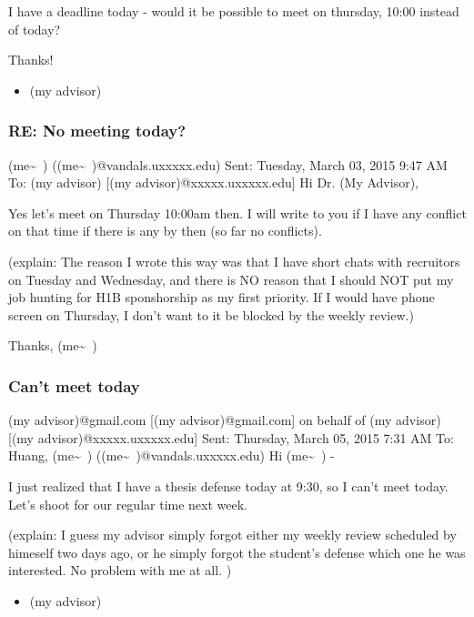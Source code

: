 \documentclass[9pt,b5paper]{article}
\begin{document}
I have a deadline today - would it be possible to meet on thursday, 10:00 instead of today?

Thanks!

\begin{itemize}
\item (my advisor)
\end{itemize}
\subsubsection{RE: No meeting today?}
\label{sec-2-3-2}
(me\textasciitilde{}~) ((me\textasciitilde{}~)@vandals.uxxxxx.edu)
Sent:        Tuesday, March 03, 2015 9:47 AM
To:        
(my advisor) [(my advisor)@xxxxx.uxxxxx.edu]
Hi Dr. (My Advisor), 

Yes let's meet on Thursday 10:00am then. I will write to you if I have any conflict on that time if there is any by then (so far no conflicts). 

(explain: The reason I wrote this way was that I have short chats with recruitors on Tuesday and Wednesday, and there is NO reason that I should NOT put my job hunting for H1B sponshorship as my first priority. If I would have phone screen on Thursday, I don't want to it be blocked by the weekly review.)

Thanks,
(me\textasciitilde{}~)
\subsubsection{Can't meet today}
\label{sec-2-3-3}
(my advisor)@gmail.com [(my advisor)@gmail.com] on behalf of (my advisor) [(my advisor)@xxxxx.uxxxxx.edu]
Sent:        Thursday, March 05, 2015 7:31 AM
To:        
Huang, (me\textasciitilde{}~) ((me\textasciitilde{}~)@vandals.uxxxxx.edu)
Hi (me\textasciitilde{}~) - 

I just realized that I have a thesis defense today at 9:30, so I can't meet today. Let's shoot for our regular time next week.

(explain: I guess my advisor simply forgot either my weekly review scheduled by himeself two days ago, or he simply forgot the student's defense which one he was interested. No problem with me at all. )

\begin{itemize}
\item (my advisor)
\end{itemize}
\end{document}
